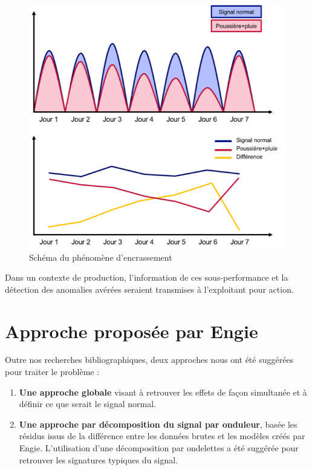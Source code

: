 \begin{figure}[!ht]
\begin{center}
\includegraphics[scale=0.8]{rapport/images/Ch1_SchemaEncrassement.png}
\end{center}
\caption{Schéma du phénomène d'encrassement}
\end{figure}
\FloatBarrier

Dans un contexte de production, l'information de ces sous-performance et la détection des anomalies avérées seraient transmises à l’exploitant pour action.

\section{Approche proposée par Engie}
Outre nos recherches bibliographiques, deux approches nous ont été suggérées pour traiter le problème :
\begin{enumerate}
\item \textbf{Une approche globale} visant à retrouver les effets de façon simultanée et à définir ce que serait le signal normal.
\item  \textbf{Une approche par décomposition du signal par onduleur}, basée les résidus issus de la différence entre les données brutes et les modèles créés par Engie. L'utilisation d'une décomposition par ondelettes a été suggérée pour retrouver les signatures typiques du signal.
\end{enumerate}
